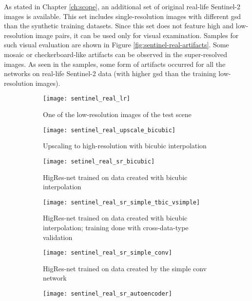 As stated in Chapter \ref{ch:scope}, an additional set of original real-life Sentinel-2 images is available.
This set includes single-resolution images with different \gls{gsd} than the synthetic training datasets.
Since this set does not feature high and low-resolution image pairs, it can be used only for visual examination.
Samples for such visual evaluation are shown in Figure \ref{fig:sentinel-real-artifacts}.
Some mosaic or checkerboard-like artifacts can be observed in the super-resolved images.
As seen in the samples, some form of artifacts occurred for all the networks on real-life Sentinel-2 data (with higher \gls{gsd} than the training low-resolution images).
\begin{figure}
    \centering
    \begin{subfigure}[t]{0.32\textwidth}
        \centering
        \texttt{[image: sentinel\_real\_lr]}
        \caption{One of the low-resolution images of the test scene}
    \end{subfigure}
    \hfill
    \begin{subfigure}[t]{0.32\textwidth}
        \centering
        \texttt{[image: sentinel\_real\_upscale\_bicubic]} 
        \caption{Upscaling to high-resolution with bicubic interpolation}
    \end{subfigure}
    \hfill
    \begin{subfigure}[t]{0.32\textwidth}
        \centering
        \texttt{[image: setinel\_real\_sr\_bicubic]}
        \caption{HigRes-net trained on data created with bicubic interpolation}
    \end{subfigure}
    \hfill
    \smallskip
    \centering
    \hfill
    \begin{subfigure}[t]{0.32\textwidth}
        \centering
        \texttt{[image: sentinel\_real\_sr\_simple\_tbic\_vsimple]}
        \caption{HigRes-net trained on data created with bicubic interpolation; training done with cross-data-type validation}
    \end{subfigure}
    \hfill
    \begin{subfigure}[t]{0.32\textwidth}
        \centering
         \texttt{[image: sentinel\_real\_sr\_simple\_conv]}
        \caption{HigRes-net trained on data created by the simple conv network}
    \end{subfigure}
    \hfill
    \begin{subfigure}[t]{0.32\textwidth}
        \centering
        \texttt{[image: sentinel\_real\_sr\_autoencoder]}

\end{subfigure}
\end{figure}

